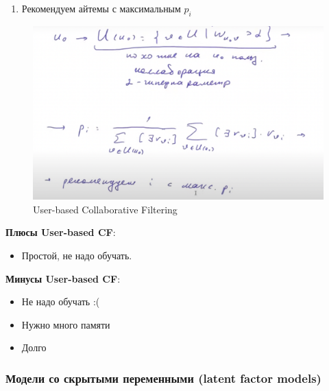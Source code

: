 \begin{enumerate}
\begin{enumerate}
                        \item Рекомендуем айтемы с максимальным $p_i$
                    \end{enumerate}
                    \begin{figure}[H]
                        \centering
                        \includegraphics[width=1\textwidth]{images/14lecture/user-based_CF.png}
                        \caption{User-based Collaborative Filtering}
                    \end{figure}

                    \textbf{Плюсы User-based CF}:
                    \begin{itemize}
                        \item Простой, не надо обучать.
                    \end{itemize}

                    \textbf{Минусы User-based CF}:
                    \begin{itemize}
                        \item Не надо обучать :(

                        \item Нужно много памяти

                        \item Долго
                    \end{itemize}
                    
                 \end{enumerate}

    \subsubsection{Модели со скрытыми переменными (latent factor models)}

